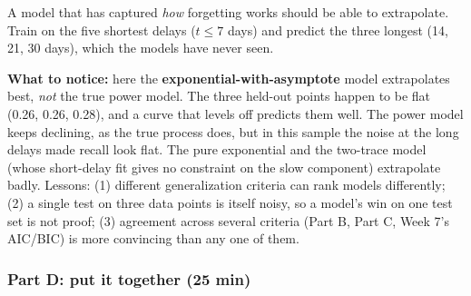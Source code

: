 A model that has captured \emph{how} forgetting works should be able to
extrapolate. Train on the five shortest delays (\(t \le 7\) days) and
predict the three longest (14, 21, 30 days), which the models have never
seen.

\textbf{What to notice:} here the \textbf{exponential-with-asymptote}
model extrapolates best, \emph{not} the true power model. The three
held-out points happen to be flat (0.26, 0.26, 0.28), and a curve that
levels off predicts them well. The power model keeps declining, as the
true process does, but in this sample the noise at the long delays made
recall look flat. The pure exponential and the two-trace model (whose
short-delay fit gives no constraint on the slow component) extrapolate
badly. Lessons: (1) different generalization criteria can rank models
differently; (2) a single test on three data points is itself noisy, so
a model's win on one test set is not proof; (3) agreement across several
criteria (Part B, Part C, Week 7's AIC/BIC) is more convincing than any
one of them.

\subsubsection{Part D: put it together (25 min)}

